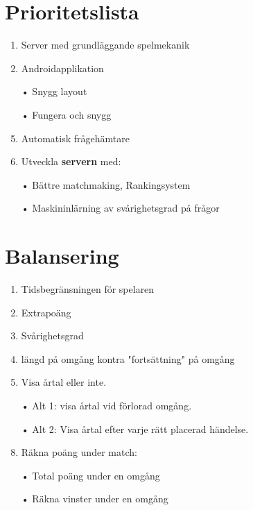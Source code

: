 \documentclass[a4paper,11pt]{article}
\begin{document}
\section{Prioritetslista}
\begin{enumerate}
\item Server med grundläggande spelmekanik
\item Androidapplikation
\item[•] Snygg layout
\item[•] Fungera och snygg
\item Automatisk frågehämtare
\item Utveckla \textbf{servern} med: 
\item[•] Bättre matchmaking, Rankingsystem 
\item[•] Maskininlärning av svårighetsgrad på frågor

\end{enumerate}

\section{Balansering}

\begin{enumerate}
\item Tidsbegränsningen för spelaren
\item Extrapoäng
\item Svårighetsgrad
\item längd på omgång kontra "fortsättning" på omgång
\item Visa årtal eller inte.
\item[•] Alt 1: visa årtal vid förlorad omgång.
\item[•] Alt 2: Visa årtal efter varje rätt placerad händelse.
\item Räkna poäng under match:
\item[•] Total poäng under en omgång
\item[•] Räkna vinster under en omgång


\end{enumerate}
\end{document}
